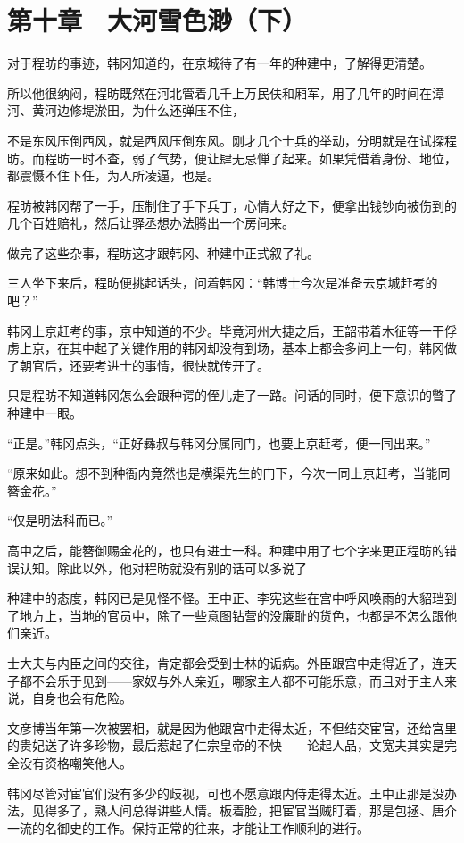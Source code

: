\section{第十章　大河雪色渺（下）}

对于程昉的事迹，韩冈知道的，在京城待了有一年的种建中，了解得更清楚。

所以他很纳闷，程昉既然在河北管着几千上万民伕和厢军，用了几年的时间在漳河、黄河边修堤淤田，为什么还弹压不住，

不是东风压倒西风，就是西风压倒东风。刚才几个士兵的举动，分明就是在试探程昉。而程昉一时不查，弱了气势，便让肆无忌惮了起来。如果凭借着身份、地位，都震慑不住下任，为人所凌逼，也是。

程昉被韩冈帮了一手，压制住了手下兵丁，心情大好之下，便拿出钱钞向被伤到的几个百姓赔礼，然后让驿丞想办法腾出一个房间来。

做完了这些杂事，程昉这才跟韩冈、种建中正式叙了礼。

三人坐下来后，程昉便挑起话头，问着韩冈：“韩博士今次是准备去京城赶考的吧？”

韩冈上京赶考的事，京中知道的不少。毕竟河州大捷之后，王韶带着木征等一干俘虏上京，在其中起了关键作用的韩冈却没有到场，基本上都会多问上一句，韩冈做了朝官后，还要考进士的事情，很快就传开了。

只是程昉不知道韩冈怎么会跟种谔的侄儿走了一路。问话的同时，便下意识的瞥了种建中一眼。

“正是。”韩冈点头，“正好彝叔与韩冈分属同门，也要上京赶考，便一同出来。”

“原来如此。想不到种衙内竟然也是横渠先生的门下，今次一同上京赶考，当能同簪金花。”

“仅是明法科而已。”

高中之后，能簪御赐金花的，也只有进士一科。种建中用了七个字来更正程昉的错误认知。除此以外，他对程昉就没有别的话可以多说了

种建中的态度，韩冈已是见怪不怪。王中正、李宪这些在宫中呼风唤雨的大貂珰到了地方上，当地的官员中，除了一些意图钻营的没廉耻的货色，也都是不怎么跟他们亲近。

士大夫与内臣之间的交往，肯定都会受到士林的诟病。外臣跟宫中走得近了，连天子都不会乐于见到——家奴与外人亲近，哪家主人都不可能乐意，而且对于主人来说，自身也会有危险。

文彦博当年第一次被罢相，就是因为他跟宫中走得太近，不但结交宦官，还给宫里的贵妃送了许多珍物，最后惹起了仁宗皇帝的不快——论起人品，文宽夫其实是完全没有资格嘲笑他人。

韩冈尽管对宦官们没有多少的歧视，可也不愿意跟内侍走得太近。王中正那是没办法，见得多了，熟人间总得讲些人情。板着脸，把宦官当贼盯着，那是包拯、唐介一流的名御史的工作。保持正常的往来，才能让工作顺利的进行。

